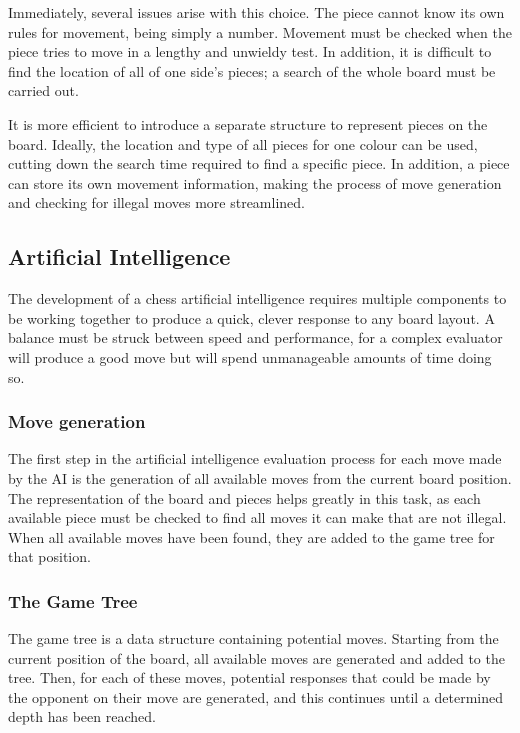 \documentclass{l3proj}
\begin{document}
	Immediately, several issues arise with this choice. The piece cannot know its own rules for movement, being simply a number. Movement must be checked when the piece tries to move in a lengthy and unwieldy test. In addition, it is difficult to find the location of all of one side’s pieces; a search of the whole board must be carried out.

	It is more efficient to introduce a separate structure to represent pieces on the board. Ideally, the location and type of all pieces for one colour can be used, cutting down the search time required to find a specific piece. In addition, a piece can store its own movement information, making the process of move generation and checking for illegal moves more streamlined.

\subsection{Artificial Intelligence}

The development of a chess artificial intelligence requires multiple components to be working together to produce a quick, clever response to any board layout. A balance must be struck between speed and performance, for a complex evaluator will produce a good move but will spend unmanageable amounts of time doing so.

\subsubsection{Move generation}

The first step in the artificial intelligence evaluation process for each move made by the AI is the generation of all available moves from the current board position. The representation of the board and pieces helps greatly in this task, as each available piece must be checked to find all moves it can make that are not illegal. When all available moves have been found, they are added to the game tree for that position.

\subsubsection{The Game Tree}

The game tree is a data structure containing potential moves. Starting from the current position of the board, all available moves are generated and added to the tree. Then, for each of these moves, potential responses that could be made by the opponent on their move are generated, and this continues until a determined depth has been reached.
\end{document}

